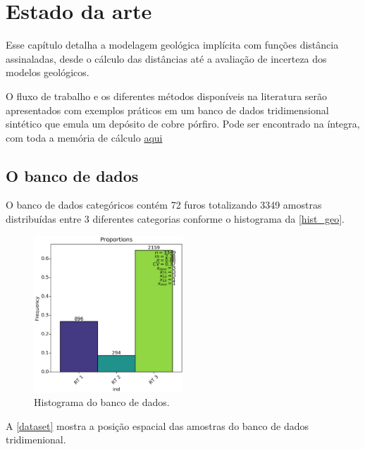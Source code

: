 \chapter{Estado da arte} \label{capitulo_2}

Esse capítulo detalha a modelagem geológica implícita com funções distância assinaladas, desde o cálculo das distâncias até a avaliação de incerteza dos modelos geológicos.

O fluxo de trabalho e os diferentes métodos disponíveis na literatura serão apresentados com exemplos práticos em um banco de dados tridimensional sintético que emula um depósito de cobre pórfiro. Pode ser encontrado na íntegra, com toda a memória de cálculo \href{https://drive.google.com/open?id=1JLRrOtOzDVCEpqnG8Ik95xws7Dw6MBvJ}{aqui}

\section{O banco de dados}

O banco de dados categóricos contém 72 furos totalizando 3349 amostras distribuídas entre 3 diferentes categorias conforme o histograma da \autoref{hist_geo}.

\begin{figure}[!htb]
	\caption{\label{hist_geo}Histograma do banco de dados.}
	\begin{center}
		\includegraphics[width=0.5\textwidth]{capitulo_2/prop_hist.png}
	\end{center}
\end{figure}

A \autoref{dataset} mostra a posição espacial das amostras do banco de dados tridimenional.

